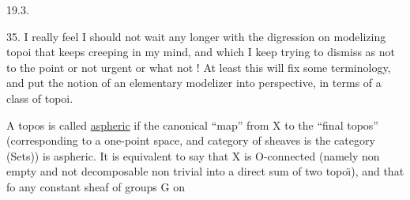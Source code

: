 19.3.

35.  I really feel I should not wait any longer with the digression on
modelizing topoi that keeps creeping in my mind,  and which I keep trying
to dismiss as not to the point or not urgent or what not !  At least this
will fix some terminology,  and put the notion of an elementary modelizer
into perspective,  in terms of a  class of topoi.

A topos  is called \uline{aspheric} if the canonical ``map'' from X to the ``final
topos'' (corresponding to a one-point space,  and  category of sheaves
is the category (Sets)) is aspheric.  It is equivalent to say that X is
O-connected (namely non empty\inserted{,} and not decomposable non trivial into a
direct sum of two topo\"{\i}),  and that fo any constant sheaf of groups G on
